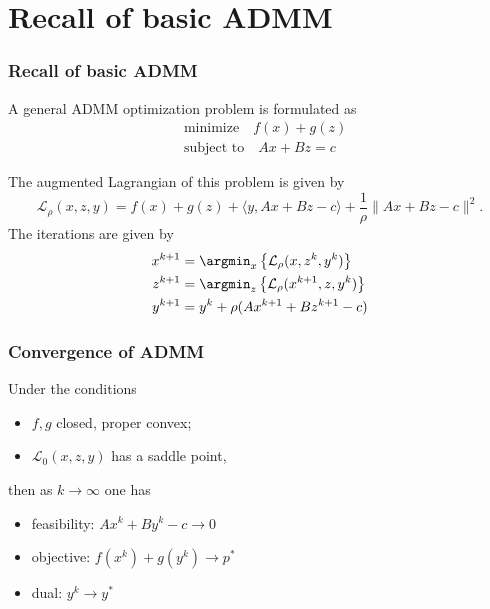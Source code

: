




\section[Recall ADMM]{Recall of basic ADMM}


\begin{frame}
\frametitle{Recall of basic ADMM}

A general ADMM optimization problem is formulated as
\begin{align*}
    & \text{minimize} \quad f(x) + g(z) \\
    & \text{subject to} \quad Ax + Bz = c
\end{align*}

\pause

The augmented Lagrangian of this problem is given by
$$\mathcal{L}_{\rho}(x,z,y) = f(x) + g(z) + \langle y, Ax+Bz-c \rangle + \dfrac{1}{\rho}\lVert Ax+Bz-c \rVert^2.$$
The iterations are given by
\begin{align*}
    x^{k+1} & = \argmin_{x} \left\{ \mathcal{L}_{\rho}(x,z^k,y^k) \right\} \\
    z^{k+1} & = \argmin_{z} \left\{ \mathcal{L}_{\rho}(x^{k+1},z,y^k) \right\} \\
    y^{k+1} & = y^{k} + \rho (Ax^{k+1}+Bz^{k+1}-c)
\end{align*}

\end{frame}


\begin{frame}
\frametitle{Convergence of ADMM}

\noindent Under the conditions
\begin{itemize}
    \item $f,g$ closed, proper convex;
    \item $\mathcal{L}_{0}(x,z,y)$ has a saddle point,
\end{itemize}
\vspace{1em}
then as $k\rightarrow\infty$ one has
\begin{itemize}
    \item feasibility: $Ax^k + By^k - c \rightarrow 0$
    \item objective: $f(x^k) + g(y^k) \rightarrow p^*$
    \item dual: $y^k \rightarrow y^*$
\end{itemize}

\end{frame}

